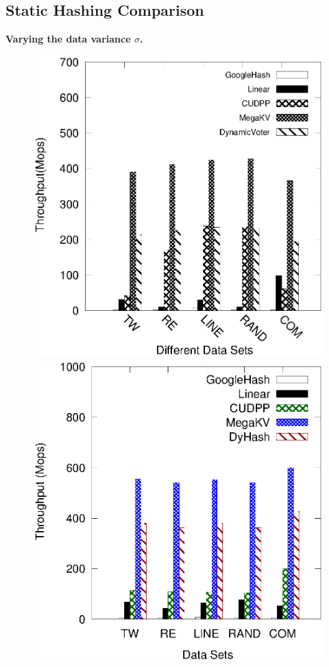 \subsection{Static Hashing Comparison}\label{sec:exp:static}
\vspace{1mm}\noindent\textbf{Varying the data variance $\sigma$.}

\begin{figure}[h]
	\begin{minipage}{0.48\linewidth}\centering
	\includegraphics[width=\linewidth]{pic/static/static_insert.eps}
	\centerline{}
	\end{minipage}
	\hfill
	\begin{minipage}{0.48\linewidth}\centering
	\includegraphics[width=\linewidth]{pic/static/static_search.eps}

\end{minipage}
\end{figure}
